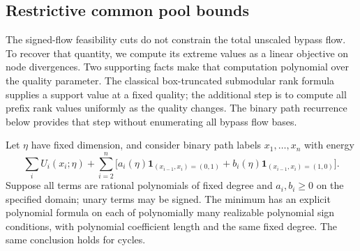 \subsection{Restrictive common pool bounds}\label{s5:common-capacity}

The signed-flow feasibility cuts do not constrain the total unscaled
bypass flow. To recover that quantity, we compute its extreme values
as a linear objective on node divergences. Two supporting facts make
that computation polynomial over the quality parameter. The classical
box-truncated submodular rank formula supplies a support value at a
fixed quality; the additional step is to compute all prefix rank values
uniformly as the quality changes. The binary path recurrence below
provides that step without enumerating all bypass flow bases.

\begin{lemma}
\label{s5:clamp}
Let $\eta$ have fixed dimension, and consider binary path labels
$x_1,\ldots,x_n$ with energy
\[
 \sum_iU_i(x_i;\eta)+\sum_{i=2}^n
 \bigl[a_i(\eta)\mathbf1_{(x_{i-1},x_i)=(0,1)}+
       b_i(\eta)\mathbf1_{(x_{i-1},x_i)=(1,0)}\bigr].
\]
Suppose all terms are rational polynomials of fixed degree and
$a_i,b_i\ge0$ on the specified domain; unary terms may be signed.
The minimum has an explicit polynomial formula on each of polynomially
many realizable polynomial sign conditions, with polynomial coefficient
length and the same fixed degree. The same conclusion holds for cycles.
\end{lemma}
